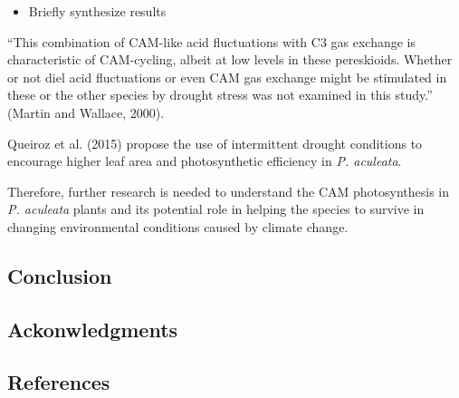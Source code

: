 \documentclass[
  12pt,
  letterpaper,
  DIV=11,
  numbers=noendperiod]{scrartcl}
\providecommand{\tightlist}{%
  \setlength{\itemsep}{0pt}\setlength{\parskip}{0pt}}\usepackage{longtable,booktabs,array}
\begin{document}
\begin{itemize}
\tightlist
\item
  Briefly synthesize results
\end{itemize}

``This combination of CAM-like acid fluctuations with C3 gas exchange is
characteristic of CAM-cycling, albeit at low levels in these
pereskioids. Whether or not diel acid fluctuations or even CAM gas
exchange might be stimulated in these or the other species by drought
stress was not examined in this study.'' (Martin and Wallace, 2000).

Queiroz et al. (2015) propose the use of intermittent drought conditions
to encourage higher leaf area and photosynthetic efficiency in \emph{P.
aculeata}.

Therefore, further research is needed to understand the CAM
photosynthesis in \emph{P. aculeata} plants and its potential role in
helping the species to survive in changing environmental conditions
caused by climate change.

\hypertarget{conclusion}{%
\subsection{Conclusion}\label{conclusion}}

\hypertarget{ackonwledgments}{%
\subsection{Ackonwledgments}\label{ackonwledgments}}

\clearpage

\hypertarget{references}{%
\subsection{References}\label{references}}
\end{document}
